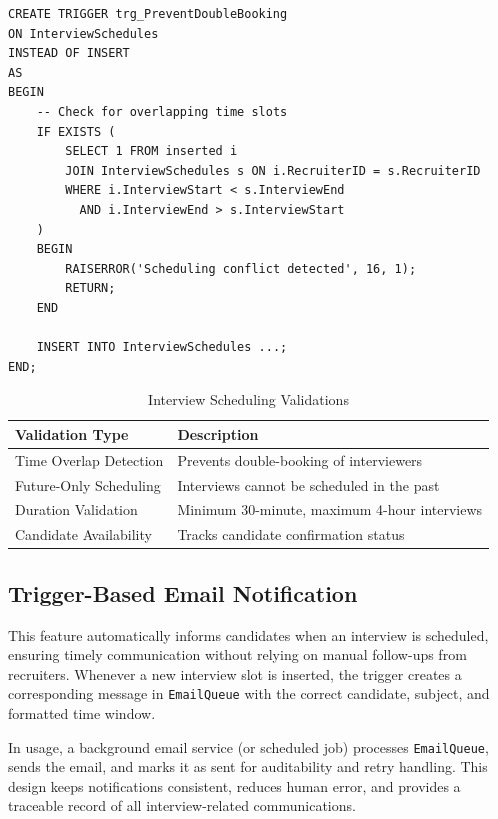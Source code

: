 \documentclass[11pt,a4paper]{article}
\begin{document}
\begin{verbatim}
CREATE TRIGGER trg_PreventDoubleBooking
ON InterviewSchedules
INSTEAD OF INSERT
AS
BEGIN
    -- Check for overlapping time slots
    IF EXISTS (
        SELECT 1 FROM inserted i
        JOIN InterviewSchedules s ON i.RecruiterID = s.RecruiterID
        WHERE i.InterviewStart < s.InterviewEnd
          AND i.InterviewEnd > s.InterviewStart
    )
    BEGIN
        RAISERROR('Scheduling conflict detected', 16, 1);
        RETURN;
    END
    
    INSERT INTO InterviewSchedules ...;
END;
\end{verbatim}

\begin{table}[H]
    \centering
    \begin{tabular}{|l|l|}
        \hline
        \rowcolor{tableheader}
        \textbf{Validation Type} & \textbf{Description} \\
        \hline
        Time Overlap Detection & Prevents double-booking of interviewers \\
        \hline
        Future-Only Scheduling & Interviews cannot be scheduled in the past \\
        \hline
        Duration Validation & Minimum 30-minute, maximum 4-hour interviews \\
        \hline
        Candidate Availability & Tracks candidate confirmation status \\
        \hline
    \end{tabular}
    \caption{Interview Scheduling Validations}
\end{table}

\subsection{Trigger-Based Email Notification}
\noindent
This feature automatically informs candidates when an interview is scheduled, ensuring timely communication without relying on manual follow-ups from recruiters. Whenever a new interview slot is inserted, the trigger creates a corresponding message in \texttt{EmailQueue} with the correct candidate, subject, and formatted time window.

In usage, a background email service (or scheduled job) processes \texttt{EmailQueue}, sends the email, and marks it as sent for auditability and retry handling. This design keeps notifications consistent, reduces human error, and provides a traceable record of all interview-related communications.
\end{document}
